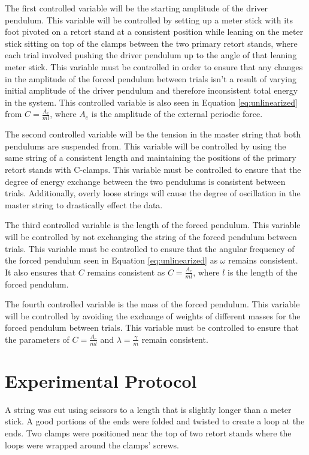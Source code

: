 \documentclass[letterpaper, 12pt]{article}
\begin{document}
The first controlled variable will be the starting amplitude of the
driver pendulum. This variable will be controlled by setting up a
meter stick with its foot pivoted on a retort stand at a
consistent position while leaning on the meter stick
sitting on top of the clamps between the two primary retort
stands, where each trial involved pushing the driver pendulum up to the
angle of that leaning meter stick. This variable must be controlled in
order to ensure that any changes in the amplitude of the forced
pendulum between trials isn't a result of varying
initial amplitude of the
driver pendulum and therefore inconsistent total energy in the system.
This controlled variable is also seen in Equation \ref*{eq:unlinearized}
from \(C = \frac{A_e}{ml}\), where \(A_e\) is the
amplitude of the external periodic force.

The second controlled variable will be the tension in the
master string that both pendulums are suspended from. This variable
will be controlled by using the same string of a consistent length
and maintaining the positions of the primary retort
stands with C-clamps. This variable must be controlled to
ensure that the degree of energy exchange between the
two pendulums is consistent between trials. Additionally,
overly loose strings will cause the degree of oscillation
in the master string to drastically effect the data.

The third controlled variable is the length of the
forced pendulum. This variable will be controlled by not
exchanging the string of the forced pendulum between trials.
This variable must be controlled to ensure that the
angular frequency of the forced pendulum seen
in Equation \ref*{eq:unlinearized} as \(\omega\)
remains consistent. It also ensures that \(C\)
remains consistent as \(C = \frac{A_e}{ml}\),
where \(l\) is the length of the forced pendulum.

The fourth controlled variable is the mass of
the forced pendulum. This variable will be controlled by
avoiding the exchange of weights of different
masses for the forced pendulum between trials.
This variable must be controlled to
ensure that the parameters of \(C = \frac{A_e}{ml}\)
and \(\lambda = \frac{\gamma}{m}\) remain consistent.

\section{Experimental Protocol}

A string was cut using scissors to a length
that is slightly longer than a meter stick.
A good portions of the ends were folded and twisted
to create a loop at the ends. Two clamps were positioned
near the top of two retort stands where the loops were
wrapped around the clamps' screws.
\end{document}
